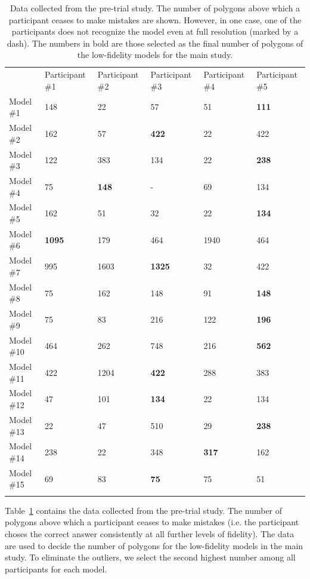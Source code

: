 \begin{table}[!htbp]
\caption{Data collected from the pre-trial study. The number of polygons above which a participant ceases to make mistakes are shown. However, in one case, one of the participants does not recognize the model even at full resolution (marked by a dash). The numbers in bold are those selected as the final number of polygons of the low-fidelity models for the main study.}
\label{tab:pts}
\begin{tabular}{llllll}
\hline\noalign{\smallskip}
& Participant \#1 & Participant \#2 & Participant \#3 & Participant \#4 & Participant \#5 \\
\noalign{\smallskip}\hline\noalign{\smallskip}
Model \#1 & 148 & 22 & 57 & 51 & \textbf{111} \\
Model \#2 & 162 & 57 & \textbf{422} & 22 & 422 \\
Model \#3 & 122 & 383 & 134 & 22 & \textbf{238} \\
Model \#4 & 75 & \textbf{148} & - & 69 & 134 \\
Model \#5 & 162 & 51 & 32 & 22 & \textbf{134} \\
Model \#6 & \textbf{1095} & 179 & 464 & 1940 & 464 \\
Model \#7 & 995 & 1603 & \textbf{1325} & 32 & 422 \\
Model \#8 & 75 & 162 & 148 & 91 & \textbf{148} \\
Model \#9 & 75 & 83 & 216 & 122 & \textbf{196} \\
Model \#10 & 464 & 262 & 748 & 216 & \textbf{562} \\
Model \#11 & 422 & 1204 & \textbf{422} & 288 & 383 \\
Model \#12 & 47 & 101 & \textbf{134} & 22 & 134 \\
Model \#13 & 22 & 47 & 510 & 29 & \textbf{238} \\
Model \#14 & 238 & 22 & 348 & \textbf{317} & 162 \\
Model \#15 & 69 & 83 & \textbf{75} & 75 & 51 \\
\noalign{\smallskip}\hline
\end{tabular}
\end{table}

Table~\ref{tab:pts} contains the data collected from the pre-trial study. The number of polygons above which a participant ceases to make mistakes (i.e. the participant choses the correct answer consistently at all further levels of fidelity). The data are used to decide the number of polygons for the low-fidelity models in the main study. To eliminate the outliers, we select the second highest number among all participants for each model.

